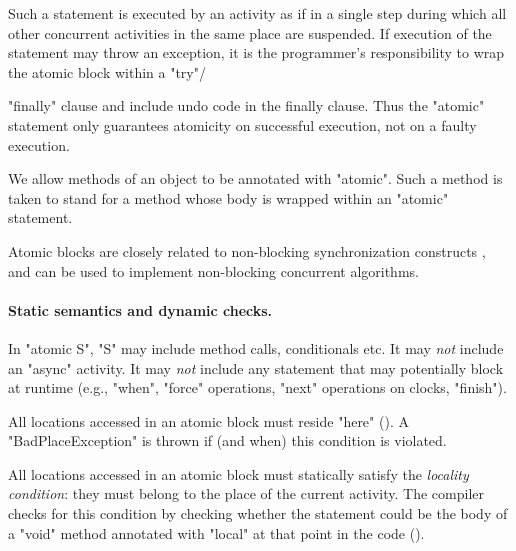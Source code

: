 Such a statement is executed by an activity as if in a single step
during which all other concurrent activities in the same place are
suspended. If execution of the statement may throw an exception, it is
the programmer's responsibility to wrap the atomic block within a
\xcd"try"/{\xcd"finally" clause and include undo code in the finally
clause. Thus the \xcd"atomic" statement only guarantees atomicity on
successful execution, not on a faulty execution.

We allow methods of an object to be annotated with \xcd"atomic". Such
a method is taken to stand for a method whose body is wrapped within an
\xcd"atomic" statement.

Atomic blocks are closely related to non-blocking synchronization
constructs \cite{herlihy91waitfree}, and can be used to implement 
non-blocking concurrent algorithms.

\paragraph{Static semantics and dynamic checks.}
In \xcd"atomic S", \xcd"S" may include method calls, conditionals etc.
It may {\em not} include an \xcd"async" activity.
It may {\em not} include any statement that may potentially block at
runtime (e.g., \xcd"when", \xcd"force" operations, \xcd"next"
operations on clocks, \xcd"finish").


All locations accessed in an atomic block must reside \xcd"here"
(). A
\xcd"BadPlaceException" is thrown
if (and when) this condition is violated.

All locations accessed in an atomic block must statically satisfy the
{\em locality condition}: they must belong to the place of the current
activity.\label{LocalityCondition} The
compiler checks for this condition by checking whether the statement
could be the body of a \xcd"void" method annotated with \xcd"local" at
that point in the code ().

}
